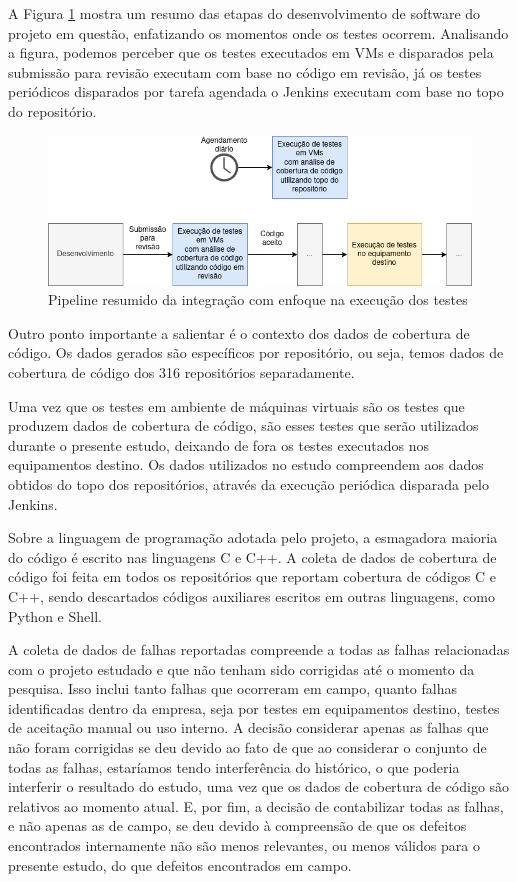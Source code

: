 \documentclass[11.5pt]{article}
\begin{document}
A Figura \ref{fig:pipeline_tests} mostra um resumo das etapas do desenvolvimento de software do
projeto em questão, enfatizando os momentos onde os testes ocorrem.
Analisando a figura, podemos perceber que os testes executados em VMs e disparados pela submissão
para revisão executam com base no código em revisão, já os testes periódicos disparados por tarefa
agendada o Jenkins executam com base no topo do repositório.

\begin{figure}[ht]
    \centering
    \includegraphics[width=1.0\textwidth]{pipeline_tests.png}
    \caption{Pipeline resumido da integração com enfoque na execução dos testes}
    \label{fig:pipeline_tests}
\end{figure}

Outro ponto importante a salientar é o contexto dos dados de cobertura de código.
Os dados gerados são específicos por repositório, ou seja, temos dados de cobertura de código dos
316 repositórios separadamente.

Uma vez que os testes em ambiente de máquinas virtuais são os testes que produzem dados de cobertura
de código, são esses testes que serão utilizados durante o presente estudo, deixando de fora os
testes executados nos equipamentos destino.
Os dados utilizados no estudo compreendem aos dados obtidos do topo dos repositórios, através da
execução periódica disparada pelo Jenkins.

Sobre a linguagem de programação adotada pelo projeto, a esmagadora maioria do código é escrito nas
linguagens C e C++.
A coleta de dados de cobertura de código foi feita em todos os repositórios que reportam cobertura
de códigos C e C++, sendo descartados códigos auxiliares escritos em outras linguagens, como Python
e Shell.

A coleta de dados de falhas reportadas compreende a todas as falhas relacionadas com o projeto
estudado e que não tenham sido corrigidas até o momento da pesquisa.
Isso inclui tanto falhas que ocorreram em campo, quanto falhas identificadas dentro da empresa, seja
por testes em equipamentos destino, testes de aceitação manual ou uso interno.
A decisão considerar apenas as falhas que não foram corrigidas se deu devido ao fato de que ao
considerar o conjunto de todas as falhas, estaríamos tendo interferência do histórico, o que poderia
interferir o resultado do estudo, uma vez que os dados de cobertura de código são relativos ao
momento atual.
E, por fim, a decisão de contabilizar todas as falhas, e não apenas as de campo, se deu devido à
compreensão de que os defeitos encontrados internamente não são menos relevantes, ou menos válidos
para o presente estudo, do que defeitos encontrados em campo.
\end{document}
